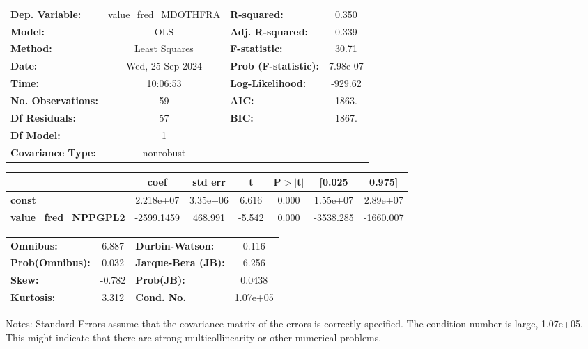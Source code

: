 \begin{center}
\begin{tabular}{lclc}
\toprule
\textbf{Dep. Variable:}       & value\_fred\_MDOTHFRA & \textbf{  R-squared:         } &     0.350   \\
\textbf{Model:}               &          OLS          & \textbf{  Adj. R-squared:    } &     0.339   \\
\textbf{Method:}              &     Least Squares     & \textbf{  F-statistic:       } &     30.71   \\
\textbf{Date:}                &    Wed, 25 Sep 2024   & \textbf{  Prob (F-statistic):} &  7.98e-07   \\
\textbf{Time:}                &        10:06:53       & \textbf{  Log-Likelihood:    } &   -929.62   \\
\textbf{No. Observations:}    &             59        & \textbf{  AIC:               } &     1863.   \\
\textbf{Df Residuals:}        &             57        & \textbf{  BIC:               } &     1867.   \\
\textbf{Df Model:}            &              1        & \textbf{                     } &             \\
\textbf{Covariance Type:}     &       nonrobust       & \textbf{                     } &             \\
\bottomrule
\end{tabular}
\begin{tabular}{lcccccc}
                              & \textbf{coef} & \textbf{std err} & \textbf{t} & \textbf{P$> |$t$|$} & \textbf{[0.025} & \textbf{0.975]}  \\
\midrule
\textbf{const}                &    2.218e+07  &     3.35e+06     &     6.616  &         0.000        &     1.55e+07    &     2.89e+07     \\
\textbf{value\_fred\_NPPGPL2} &   -2599.1459  &      468.991     &    -5.542  &         0.000        &    -3538.285    &    -1660.007     \\
\bottomrule
\end{tabular}
\begin{tabular}{lclc}
\textbf{Omnibus:}       &  6.887 & \textbf{  Durbin-Watson:     } &    0.116  \\
\textbf{Prob(Omnibus):} &  0.032 & \textbf{  Jarque-Bera (JB):  } &    6.256  \\
\textbf{Skew:}          & -0.782 & \textbf{  Prob(JB):          } &   0.0438  \\
\textbf{Kurtosis:}      &  3.312 & \textbf{  Cond. No.          } & 1.07e+05  \\
\bottomrule
\end{tabular}
\end{center}

Notes: \newline
 [1] Standard Errors assume that the covariance matrix of the errors is correctly specified. \newline
 [2] The condition number is large, 1.07e+05. This might indicate that there are \newline
 strong multicollinearity or other numerical problems.